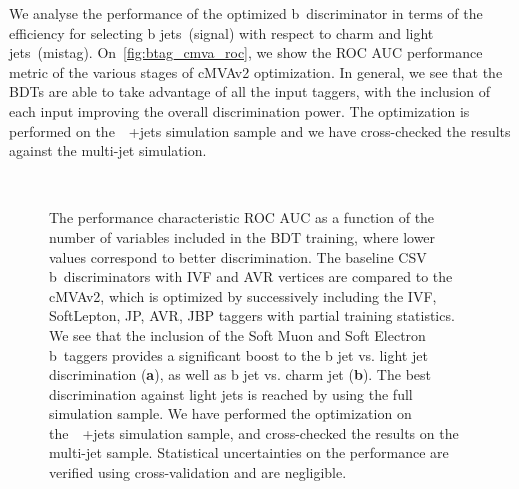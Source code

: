 We analyse the performance of the optimized b~discriminator in terms of the efficiency for selecting b jets~(signal) with respect to charm and light jets~(mistag). On~\cref{fig:btag_cmva_roc}, we show the ROC AUC performance metric of the various stages of cMVAv2 optimization. In general, we see that the BDTs are able to take advantage of all the input taggers, with the inclusion of each input improving the overall discrimination power. The optimization is performed on the~\ttbar~+jets simulation sample and we have cross-checked the results against the multi-jet simulation.

\begin{figure}
\begin{centering}
 \\
\caption{The performance characteristic ROC AUC as a function of the number of variables included in the BDT training, where lower values correspond to better discrimination. The baseline CSV b~discriminators with IVF and AVR vertices are compared to the cMVAv2, which is optimized by successively including the IVF, SoftLepton, JP, AVR, JBP taggers with partial training statistics. We see that the inclusion of the Soft Muon and Soft Electron b~taggers provides a significant boost to the b jet vs. light jet discrimination (\textbf{a}), as well as b jet vs. charm jet (\textbf{b}). The best discrimination against light jets is reached by using the full simulation sample. We have performed the optimization on the~\ttbar~+jets simulation sample, and cross-checked the results on the multi-jet sample. Statistical uncertainties on the performance are verified using cross-validation and are negligible.}

\end{centering}
\end{figure}
